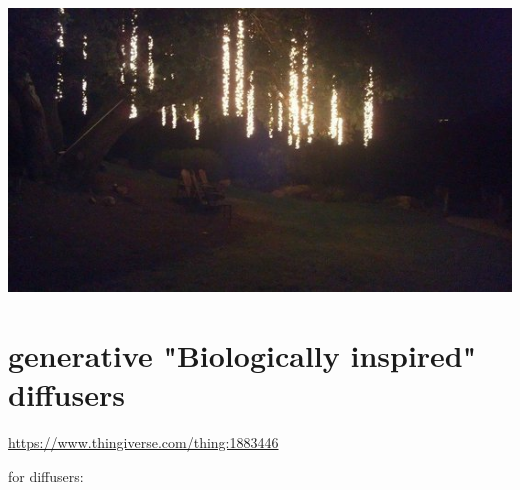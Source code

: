 \documentclass[11pt]{article}
\begin{document}
\begin{center}
\includegraphics[width=.9\linewidth]{./samples/1.jpg}
\end{center}

\section{generative "Biologically inspired" diffusers}
\label{sec:org864840c}

\url{https://www.thingiverse.com/thing:1883446}

for diffusers: 
\end{document}
